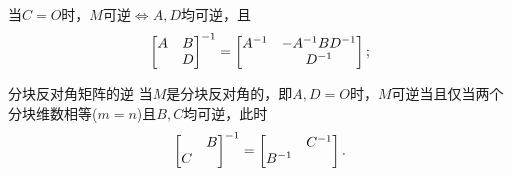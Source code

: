 \begin{corollary}
	当$C = O$时，$M$可逆$\iff A,D$均可逆，且
	\begin{equation}
		\begin{bmatrix}
			A&B\\ &D
		\end{bmatrix}^{-1} = \begin{bmatrix}
			A^{-1}&-A^{-1} BD^{-1}\\
			& D^{-1}
		\end{bmatrix};
	\end{equation}
\end{corollary}

\begin{theorem}
	{分块反对角矩阵的逆}{}
	当$M$是分块反对角的，即$A,D = O$时，$M$可逆当且仅当两个分块维数相等($m = n$)且$B,C$均可逆，此时
	\begin{equation}
		\begin{bmatrix}
			&B\\C
		\end{bmatrix}^{-1} = \begin{bmatrix}
			&C^{-1}\\B^{-1}
		\end{bmatrix}.
	\end{equation}
\end{theorem}


